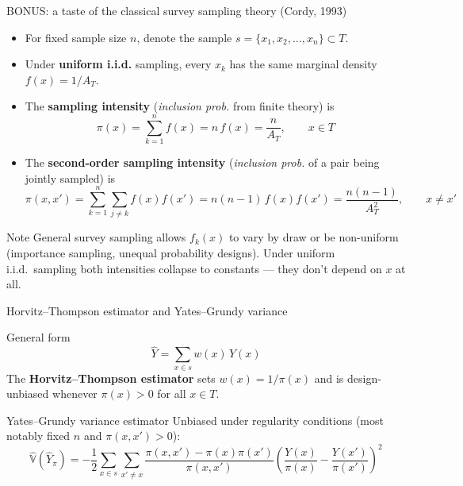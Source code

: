 \documentclass[
  ignorenonframetext,
  aspectratio=169,
]{beamer}
\providecommand{\tightlist}{%
  \setlength{\itemsep}{0pt}\setlength{\parskip}{0pt}}
\begin{document}
\begin{frame}{BONUS: a taste of the classical survey sampling theory
(Cordy, 1993)}
\label{bonus-a-taste-of-the-classical-survey-sampling-theory-cordy-1993}
\footnotesize

\begin{itemize}
\tightlist
\item
  For fixed sample size \(n\), denote the sample
  \(s = \{x_1, x_2, \dots, x_n\} \subset T\).
\item
  Under \textbf{uniform i.i.d.} sampling, every \(x_k\) has the same
  marginal density \(f(x) = 1/A_T\).
\item
  The \textbf{sampling intensity} (\textit{inclusion prob.} from finite
  theory) is \[
  \pi(x) = \sum_{k=1}^n f(x) = n\,f(x) = \frac{n}{A_T}, \qquad x \in T
  \]
\item
  The \textbf{second-order sampling intensity} (\textit{inclusion prob.}
  of a pair being jointly sampled) is \[
  \pi(x,x') = \sum_{k=1}^n\sum_{j\neq k} f(x)f(x') = n(n-1)\,f(x)f(x') = \frac{n(n-1)}{A_T^2}, \qquad x \neq x'
  \]
\end{itemize}

\pause

\begin{block}{Note}
General survey sampling allows $f_k(x)$ to vary by draw or be non-uniform (importance sampling, unequal probability designs). Under uniform i.i.d.\ sampling both intensities collapse to constants --- they don't depend on $x$ at all.
\end{block}
\end{frame}

\begin{frame}{Horvitz--Thompson estimator and Yates--Grundy variance}
\label{horvitzthompson-estimator-and-yatesgrundy-variance}
\footnotesize

\begin{block}{General form}
\[
\hat Y = \sum_{x \in s} w(x)\,Y(x)
\]
The \textbf{Horvitz--Thompson estimator} sets $w(x) = 1/\pi(x)$ and is design-unbiased whenever $\pi(x) > 0$ for all $x \in T$.
\end{block}

\pause

\begin{block}{Yates--Grundy variance estimator}
Unbiased under regularity conditions (most notably fixed $n$ and $\pi(x,x') > 0$):
\[
\hat{\mathbb{V}}(\hat Y_\pi) = -\frac{1}{2}\sum_{x \in s}\sum_{x' \neq x} \frac{\pi(x,x') - \pi(x)\pi(x')}{\pi(x,x')} \left(\frac{Y(x)}{\pi(x)} - \frac{Y(x')}{\pi(x')}\right)^2
\]
\end{block}
\end{frame}
\end{document}
